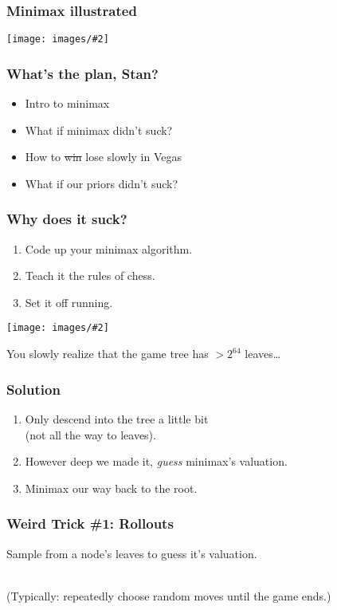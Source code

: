 \documentclass[table]{beamer}
\newcommand\img[2]{\texttt{[image: images/\#2]}}
\begin{document}
\begin{frame}
	\frametitle{Minimax illustrated}
	\begin{center}
		\img{1}{games-7.jpg}
	\end{center}
\end{frame}

\begin{frame}
	\frametitle{What's the plan, Stan?}
	\begin{itemize}
		\setlength\itemsep{5ex}
		\item Intro to minimax
		\item \alert{What if minimax didn't suck?}
		\item How to \sout{win} lose slowly in Vegas
		\item What if our priors didn't suck?
	\end{itemize}
\end{frame}

\begin{frame}
	\frametitle{Why does it suck?}
	\begin{enumerate}
		\item Code up your minimax algorithm.
		\item Teach it the rules of chess.
		\item Set it off running.
	\end{enumerate}

	\begin{center}
		\img{0.4}{hourglass.jpg}
	\end{center}

	You slowly realize that the game tree has $>2^{64}$ leaves\ldots
\end{frame}

\begin{frame}
	\frametitle{Solution}
	\begin{enumerate}
		\item Only descend into the tree a little bit\\(not all the way to
			leaves).
		\item However deep we made it, \emph{guess}\footnotemark{} minimax's valuation.
		\item Minimax our way back to the root.
	\end{enumerate}
\end{frame}

\begin{frame}
	\frametitle{Weird Trick \#1: Rollouts}
	\alert{Sample} from a node's leaves to guess it's valuation.

	\\[8ex]

	(Typically: repeatedly choose random moves until the game ends.)
\end{frame}
\end{document}
